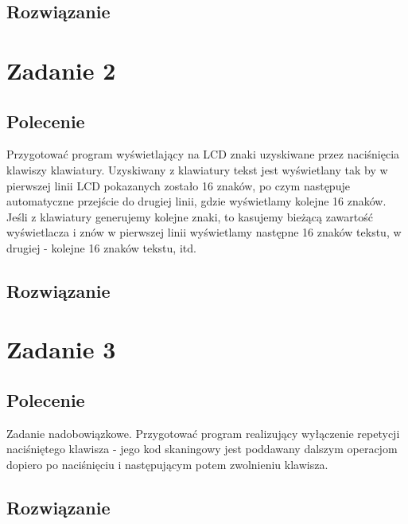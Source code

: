 \documentclass[a4paper,12pt]{extarticle}  %
\begin{document}
\subsection{Rozwiązanie}

\section{Zadanie 2}
\subsection{Polecenie}
Przygotować program wyświetlający na LCD znaki uzyskiwane przez naciśnięcia klawiszy klawiatury. Uzyskiwany
    z klawiatury tekst jest wyświetlany tak by w pierwszej linii LCD pokazanych zostało 16 znaków, po czym następuje
    automatyczne przejście do drugiej linii, gdzie wyświetlamy kolejne 16 znaków. Jeśli z klawiatury generujemy
    kolejne znaki, to kasujemy bieżącą zawartość wyświetlacza i znów w pierwszej linii wyświetlamy następne
    16 znaków tekstu, w drugiej - kolejne 16 znaków tekstu, itd.
\subsection{Rozwiązanie}

\section{Zadanie 3}
\subsection{Polecenie}
Zadanie nadobowiązkowe. Przygotować program realizujący wyłączenie repetycji naciśniętego klawisza
    - jego kod skaningowy jest poddawany dalszym operacjom dopiero po naciśnięciu i następującym potem
    zwolnieniu klawisza.
\subsection{Rozwiązanie}

\end{document}
